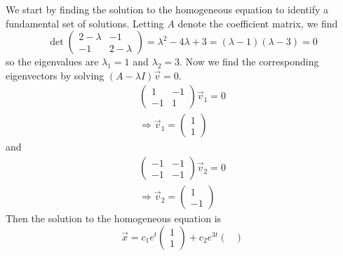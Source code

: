 \documentclass[11pt, titlepage]{article}
\begin{document}
\begin{enumerate}
        \begin{solution}
            We start by finding the solution to the homogeneous equation to identify a fundamental set of solutions.
            Letting $A$ denote the coefficient matrix, we find
            \[
            \det
            \begin{pmatrix}
                2 - \lambda & -1 \\
                -1 & 2 - \lambda
            \end{pmatrix} =
            \lambda^2 - 4 \lambda + 3 = (\lambda - 1) (\lambda - 3) = 0
            \]
            so the eigenvalues are $\lambda_1 = 1$ and $\lambda_2 = 3$.
            Now we find the corresponding eigenvectors by solving $(A - \lambda I) \vec{v} = 0$.
            \begin{gather*}
                \begin{pmatrix}
                    1 & -1 \\
                    -1 & 1
                \end{pmatrix} \vec{v}_1 = 0 \\
                \Longrightarrow
                \vec{v}_1 =
                \begin{pmatrix}
                    1 \\
                    1
                \end{pmatrix}
            \end{gather*}
            and
            \begin{gather*}
                \begin{pmatrix}
                    -1 & -1 \\
                    -1 & -1
                \end{pmatrix} \vec{v}_2 = 0 \\
                \Longrightarrow
                \vec{v}_2 =
                \begin{pmatrix}
                    1 \\
                    -1
                \end{pmatrix}
            \end{gather*}
            Then the solution to the homogeneous equation is
            \[
            \vec{x} = c_1 e^{t}
            \begin{pmatrix}
                1 \\
                1
            \end{pmatrix} + c_2 e^{3t}
            \begin{pmatrix}

\end{pmatrix}\]
\end{solution}
\end{enumerate}
\end{document}
